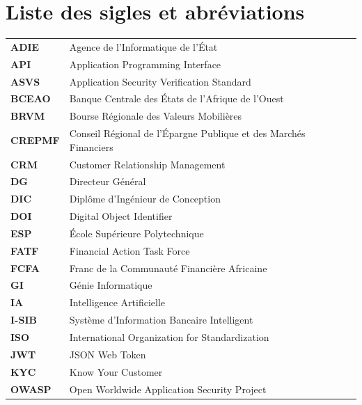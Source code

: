 \chapter*{Liste des sigles et abréviations}
{}
\begingroup
\small
\renewcommand{\arraystretch}{0.92}
\begin{longtable}{@{}p{2.5cm}p{10.5cm}}
\textbf{ADIE}    & Agence de l'Informatique de l'État \\[2pt]
\textbf{API}     & Application Programming Interface \\[2pt]
\textbf{ASVS}    & Application Security Verification Standard \\[2pt]
\textbf{BCEAO}   & Banque Centrale des États de l'Afrique de l'Ouest \\[2pt]
\textbf{BRVM}    & Bourse Régionale des Valeurs Mobilières \\[2pt]
\textbf{CREPMF}  & Conseil Régional de l'Épargne Publique et des Marchés Financiers \\[2pt]
\textbf{CRM}     & Customer Relationship Management \\[2pt]
\textbf{DG}      & Directeur Général \\[2pt]
\textbf{DIC}     & Diplôme d'Ingénieur de Conception \\[2pt]
\textbf{DOI}     & Digital Object Identifier \\[2pt]
\textbf{ESP}     & École Supérieure Polytechnique \\[2pt]
\textbf{FATF}    & Financial Action Task Force \\[2pt]
\textbf{FCFA}    & Franc de la Communauté Financière Africaine \\[2pt]
\textbf{GI}      & Génie Informatique \\[2pt]
\textbf{IA}      & Intelligence Artificielle \\[2pt]
\textbf{I-SIB}   & Système d'Information Bancaire Intelligent \\[2pt]
\textbf{ISO}     & International Organization for Standardization \\[2pt]
\textbf{JWT}     & JSON Web Token \\[2pt]
\textbf{KYC}     & Know Your Customer \\[2pt]
\textbf{OWASP}   & Open Worldwide Application Security Project \\[2pt]

\end{longtable}
